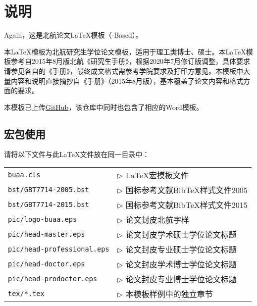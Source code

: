 \chapter{说明}

Again，这是北航论文\LaTeX{}模板（\CTeX{}-Based）\BUAAThesis{}。

本\LaTeX{}模板为北航研究生学位论文模板，适用于理工类博士、硕士。本\LaTeX{}模板参考自2015年8月版北航《研究生手册》，根据2020年7月修订版调整，具体要求请参见各自的《手册》，最终成文格式需参考学院要求及打印方意见。本模板中大量内容和说明直接摘抄自《手册》（2015年8月版），基本覆盖了论文内容和格式方面的要求。

本模板已上传\href{https://github.com/CheckBoxStudio/BUAAThesis}{GitHub}，该仓库中同时也包含了相应的Word模板。

\section{宏包使用}

请将以下文件与此LaTeX文件放在同一目录中：

\begin{tabular}{ll}
  \verb|buaa.cls | & $\triangleright$ LaTeX宏模板文件                \\
  \verb|bst/GBT7714-2005.bst| & $\triangleright$ 国标参考文献BibTeX样式文件2005 \\
  \verb|bst/GBT7714-2015.bst| & $\triangleright$ 国标参考文献BibTeX样式文件2015 \\
  \verb|pic/logo-buaa.eps| & $\triangleright$ 论文封皮北航字样               \\
  \verb|pic/head-master.eps| & $\triangleright$ 论文封皮学术硕士学位论文标题   \\
  \verb|pic/head-professional.eps| & $\triangleright$ 论文封皮专业硕士学位论文标题   \\
  \verb|pic/head-doctor.eps| & $\triangleright$ 论文封皮学术博士学位论文标题   \\
  \verb|pic/head-prodoctor.eps| & $\triangleright$ 论文封皮专业博士学位论文标题   \\
  \verb|tex/*.tex| & $\triangleright$ 本模板样例中的独立章节         \\
\end{tabular}\\

